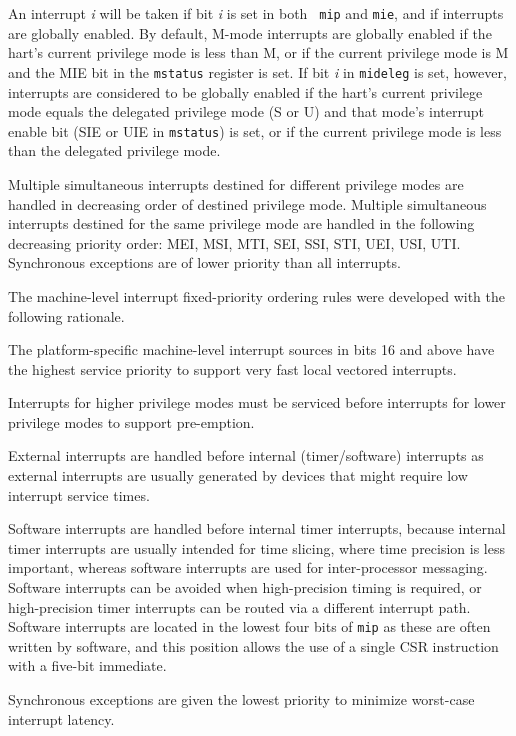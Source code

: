 An interrupt {\em i} will be taken if bit {\em i} is set in both {\tt
  mip} and {\tt mie}, and if interrupts are globally enabled.  By
default, M-mode interrupts are globally enabled if the hart's current
privilege mode is less than M, or if the current privilege mode is M
and the MIE bit in the {\tt mstatus} register is set.  If bit {\em i}
in {\tt mideleg} is set, however, interrupts are considered to be
globally enabled if the hart's current privilege mode equals the
delegated privilege mode (S or U) and that mode's interrupt enable
bit (SIE or UIE in {\tt mstatus}) is set, or if the current
privilege mode is less than the delegated privilege mode.

Multiple simultaneous interrupts destined for different privilege modes are
handled in decreasing order of destined privilege mode.  Multiple simultaneous
interrupts destined for the same privilege mode are handled in the following
decreasing priority order: MEI, MSI, MTI, SEI, SSI, STI, UEI, USI, UTI.
Synchronous exceptions are of lower priority than all interrupts.

\begin{commentary}
  The machine-level interrupt fixed-priority ordering rules were developed
  with the following rationale.
  
  The platform-specific machine-level interrupt sources in bits 16 and
  above have the highest service priority to support very fast local
  vectored interrupts.
  
  Interrupts for higher privilege modes must be serviced before
  interrupts for lower privilege modes to support pre-emption.

  External interrupts are handled before internal (timer/software)
  interrupts as external interrupts are usually generated by devices
  that might require low interrupt service times.

  Software interrupts are handled before internal timer interrupts,
  because internal timer interrupts are usually intended for time
  slicing, where time precision is less important, whereas software
  interrupts are used for inter-processor messaging.  Software
  interrupts can be avoided when high-precision timing is required, or
  high-precision timer interrupts can be routed via a different
  interrupt path.
  Software interrupts are located in the lowest four bits of {\tt mip}
  as these are often written by software, and this position allows the
  use of a single CSR instruction with a five-bit immediate.

  Synchronous exceptions are given the lowest priority to minimize
  worst-case interrupt latency.
\end{commentary}

